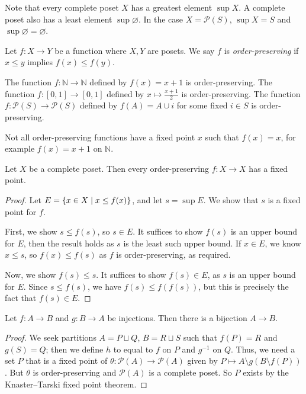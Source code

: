 Note that every complete poset \( X \) has a greatest element \( \sup X \).
A complete poset also has a least element \( \sup \varnothing \).
In the case \( X = \mathcal P(S) \), \( \sup X = S \) and \( \sup \varnothing = \varnothing \).
\begin{definition}
    Let \( f \colon X \to Y \) be a function where \( X, Y \) are posets.
    We say \( f \) is \emph{order-preserving} if \( x \leq y \) implies \( f(x) \leq f(y) \).
\end{definition}
\begin{example}
    The function \( f \colon \mathbb N \to \mathbb N \) defined by \( f(x) = x + 1 \) is order-preserving.
    The function \( f \colon [0,1] \to [0,1] \) defined by \( x \mapsto \frac{x+1}{2} \) is order-preserving.
    The function \( f \colon \mathcal P(S) \to \mathcal P(S) \) defined by \( f(A) = A \cup \qty{i} \) for some fixed \( i \in S \) is order-preserving.
\end{example}
Not all order-preserving functions have a fixed point \( x \) such that \( f(x) = x \), for example \( f(x) = x + 1 \) on \( \mathbb N \).
\begin{theorem}
    Let \( X \) be a complete poset.
    Then every order-preserving \( f \colon X \to X \) has a fixed point.
\end{theorem}
\begin{proof}
    Let \( E = \qty{x \in X \mid x \leq f(x)} \), and let \( s = \sup E \).
    We show that \( s \) is a fixed point for \( f \).

    First, we show \( s \leq f(s) \), so \( s \in E \).
    It suffices to show \( f(s) \) is an upper bound for \( E \), then the result holds as \( s \) is the least such upper bound.
    If \( x \in E \), we know \( x \leq s \), so \( f(x) \leq f(s) \) as \( f \) is order-preserving, as required.

    Now, we show \( f(s) \leq s \).
    It suffices to show \( f(s) \in E \), as \( s \) is an upper bound for \( E \).
    Since \( s \leq f(s) \), we have \( f(s) \leq f(f(s)) \), but this is precisely the fact that \( f(s) \in E \).
\end{proof}
\begin{corollary}
    Let \( f \colon A \to B \) and \( g \colon B \to A \) be injections.
    Then there is a bijection \( A \to B \).
\end{corollary}
\begin{proof}
    We seek partitions \( A = P \sqcup Q \), \( B = R \sqcup S \) such that \( f(P) = R \) and \( g(S) = Q \); then we define \( h \) to equal to \( f \) on \( P \) and \( g^{-1} \) on \( Q \).
    Thus, we need a set \( P \) that is a fixed point of \( \theta \colon \mathcal P(A) \to \mathcal P(A) \) given by \( P \mapsto A \setminus g(B \setminus f(P)) \).
    But \( \theta \) is order-preserving and \( \mathcal P(A) \) is a complete poset.
    So \( P \) exists by the Knaster--Tarski fixed point theorem.
\end{proof}

